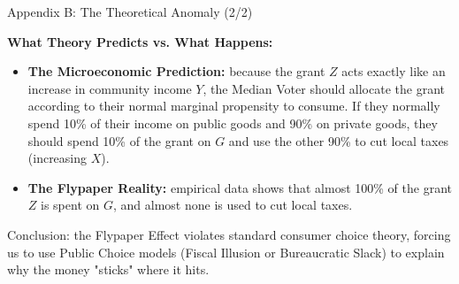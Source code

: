 \documentclass[10pt]{beamer}
\begin{document}
\begin{frame}{Appendix B: The Theoretical Anomaly (2/2)}


\textbf{What Theory Predicts vs. What Happens:}
\begin{itemize}
\item \textbf{The Microeconomic Prediction:} because the grant $Z$ acts exactly like an increase in community income $Y$, the Median Voter should allocate the grant according to their normal marginal propensity to consume. If they normally spend 10\% of their income on public goods and 90\% on private goods, they should spend 10\% of the grant on $G$ and use the other 90\% to cut local taxes (increasing $X$).
\item \textbf{The Flypaper Reality:} empirical data shows that almost 100\% of the grant $Z$ is spent on $G$, and almost none is used to cut local taxes. 
\end{itemize}

\alert{Conclusion:} the Flypaper Effect violates standard consumer choice theory, forcing us to use Public Choice models (Fiscal Illusion or Bureaucratic Slack) to explain why the money "sticks" where it hits.
\end{frame}
\end{document}
